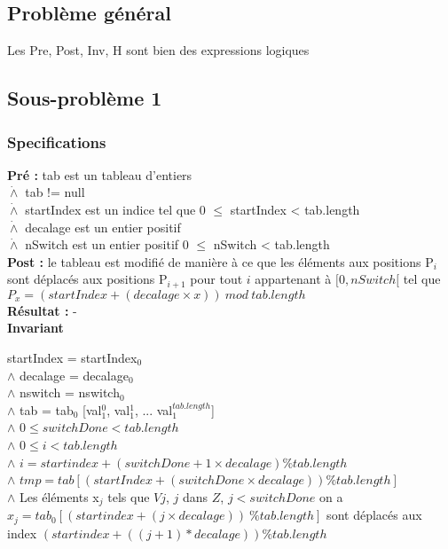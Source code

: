 \subsection{Problème général}
Les Pre, Post, Inv, H sont bien des expressions logiques 
\subsection{Sous-problème 1}

\subsubsection*{Specifications}
\noindent \textbf{Pré : } tab est un tableau d'entiers\\
 	  \indent \indent $\dot{\wedge}$ tab != null\\
	  \indent \indent $\dot{\wedge}$ startIndex est un indice tel que 0 $\leq$ startIndex < tab.length \\
	  \indent \indent $\dot{\wedge}$ decalage est un entier positif \\
	  \indent \indent $\dot{\wedge}$ nSwitch est un entier positif 0 $\leq$ nSwitch < tab.length\\
\textbf{Post :}  le tableau est modifié de manière à ce que les éléments aux positions P$_{i}$ sont déplacés aux positions P$_{i+1}$ pour tout $i$ appartenant à $[0,nSwitch[$ tel que $P_{x} = (startIndex + (decalage\times x))\ mod\ tab.length$\\
\textbf{Résultat :}  - \\


\textbf{Invariant}

	startIndex = startIndex$_{0}$\\
$\wedge$ decalage = decalage$_{0}$\\
$\wedge$ nswitch = nswitch$_{0}$\\
$\wedge$ tab = tab$_{0}$ [val$_{1}^{0}$, val$_{1}^{1}$, ... val$_{1}^{tab.length}$]\\
$\wedge$ $0\leq switchDone < tab.length$\\
$\wedge$ $0\leq i < tab.length$\\
$\wedge$ $i = startindex + (switchDone+1\times decalage) \% tab.length$\\
$\wedge$ $tmp = tab[(startIndex + (switchDone\times decalage))  \% tab.length]$\\
$\wedge$ Les éléments x$_{j}$ tels que $Vj$, $j$ dans $Z$, $j<switchDone$ on a $x_{j}=tab_{0}[(startindex + (j\times decalage))\ \% tab.length]$ sont déplacés aux index $(startindex + ((j+1)* decalage))\%tab.length$\\

